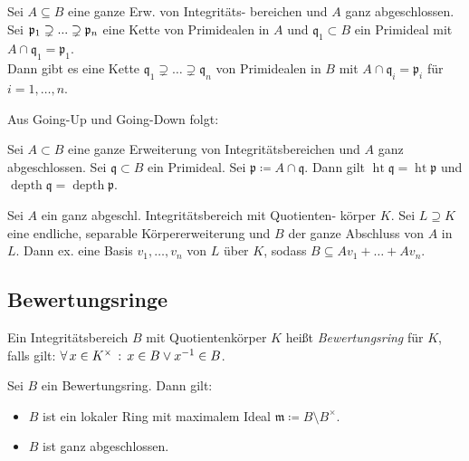 \documentclass{cheat-sheet}
\DeclareMathOperator{\height}{ht} %
\DeclareMathOperator{\depth}{depth} %
\newcommand{\ppp}{\mathfrak{p}}
\newcommand{\qqq}{\mathfrak{q}}
\newcommand{\mmm}{\mathfrak{m}}
\begin{document}

\begin{satz}
  Sei $A \subseteq B$ eine ganze Erw. von Integritäts- bereichen und $A$ ganz abgeschlossen.
  Sei $\ppp_1 \supsetneq \nldots \supsetneq \ppp_n$ eine Kette von Primidealen in $A$ und $\qqq_1 \subset B$ ein Primideal mit $A \cap \qqq_1 = \ppp_1$. \\
  Dann gibt es eine Kette $\qqq_1 \supsetneq \ldots \supsetneq \qqq_n$ von Primidealen in $B$ mit $A \cap \qqq_i = \ppp_i$ für $i = 1, \ldots, n$.
\end{satz}

Aus Going-Up und Going-Down folgt:

\begin{lem}
  Sei $A \subset B$ eine ganze Erweiterung von Integritätsbereichen und $A$ ganz abgeschlossen.
  Sei $\qqq \subset B$ ein Primideal.
  Sei $\ppp \coloneqq A \cap \qqq$.
  Dann gilt \enspace
  $\height \qqq = \height \ppp$ und $\depth \qqq = \depth \ppp$.
\end{lem}

\begin{prop}
  Sei $A$ ein ganz abgeschl. Integritätsbereich mit Quotienten- körper $K$.
  Sei $L \supseteq K$ eine endliche, separable Körpererweiterung und $B$ der ganze Abschluss von $A$ in $L$.
  Dann ex. eine Basis $v_1, \ldots, v_n$ von $L$ über $K$, sodass $B \subseteq A v_1 + \ldots + A v_n$.
\end{prop}


\subsection{Bewertungsringe}


\begin{defn}
  Ein Integritätsbereich $B$ mit Quotientenkörper $K$ heißt \emph{Bewertungsring} für $K$, falls gilt: $\forall \, {x \in K^{\times}} \,:\, x \in B \vee x^{-1} \in B$.
\end{defn}

\begin{prop}
  Sei $B$ ein Bewertungsring.
  Dann gilt:
  \begin{itemize}
    \item $B$ ist ein lokaler Ring mit maximalem Ideal $\mmm \coloneqq B \setminus B^{\times}$.
    \item $B$ ist ganz abgeschlossen.
  \end{itemize}
\end{prop}
\end{document}

